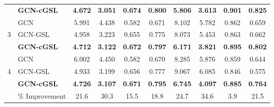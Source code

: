 \documentclass[pdflatex,sn-mathphys-num]{sn-jnl}%
\theoremstyle{thmstyleone}%
\theoremstyle{thmstyletwo}%
\theoremstyle{thmstylethree}%
\begin{document}
\begin{table}[!t]
\begin{tabular}{cl|cccc|cccc}
                     & \textbf{GCN-cGSL} & \textbf{4.672} & \textbf{3.051} & \textbf{0.674} & \textbf{0.800} & \textbf{5.806} & \textbf{3.613} & \textbf{0.901} & \textbf{0.825} \\
                    \hdashline
                     &             GCN &          5.991 &          4.438 &          0.582 &          0.671 &          8.102 &          5.782 &          0.862 &          0.659 \\
                    3 &  GCN-GSL &          4.958 &          3.223 &          0.655 &          0.775 &          8.073 &          5.453 &          0.863 &          0.662 \\
                     & \textbf{GCN-cGSL} & \textbf{4.712} & \textbf{3.122} & \textbf{0.672} & \textbf{0.797} & \textbf{6.171} & \textbf{3.821} & \textbf{0.895} & \textbf{0.802} \\
                    \hdashline
                     &             GCN &          6.002 &          4.450 &          0.582 &          0.670 &          8.285 &          5.876 &          0.859 &          0.644 \\
                    4 &  GCN-GSL &          4.933 &          3.199 &          0.656 &          0.777 &          9.067 &          6.085 &          0.846 &          0.575 \\
                     & \textbf{GCN-cGSL} & \textbf{4.726} & \textbf{3.107} & \textbf{0.671} & \textbf{0.795} & \textbf{6.745} & \textbf{4.097} & \textbf{0.885} & \textbf{0.764} \\
                    \hdashline
                     & \% Improvement &          21.6 &          30.3 &          15.5 &          18.8 &          24.7 &          34.6 &           3.9 &          21.5 \\
    \bottomrule
\end{tabular}
  \end{table}
\end{document}
